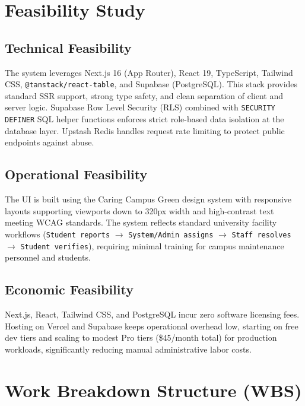\documentclass[12pt, a4paper]{article}
\begin{document}
\newpage

\section{Feasibility Study}

\subsection{Technical Feasibility}
The system leverages Next.js 16 (App Router), React 19, TypeScript, Tailwind CSS, \texttt{@tanstack/react-table}, and Supabase (PostgreSQL). This stack provides standard SSR support, strong type safety, and clean separation of client and server logic. Supabase Row Level Security (RLS) combined with \texttt{SECURITY DEFINER} SQL helper functions enforces strict role-based data isolation at the database layer. Upstash Redis handles request rate limiting to protect public endpoints against abuse.

\subsection{Operational Feasibility}
The UI is built using the Caring Campus Green design system with responsive layouts supporting viewports down to 320px width and high-contrast text meeting WCAG standards. The system reflects standard university facility workflows (\texttt{Student reports} $\rightarrow$ \texttt{System/Admin assigns} $\rightarrow$ \texttt{Staff resolves} $\rightarrow$ \texttt{Student verifies}), requiring minimal training for campus maintenance personnel and students.

\subsection{Economic Feasibility}
Next.js, React, Tailwind CSS, and PostgreSQL incur zero software licensing fees. Hosting on Vercel and Supabase keeps operational overhead low, starting on free dev tiers and scaling to modest Pro tiers (\$45/month total) for production workloads, significantly reducing manual administrative labor costs.

\newpage

\section{Work Breakdown Structure (WBS)}
\end{document}
